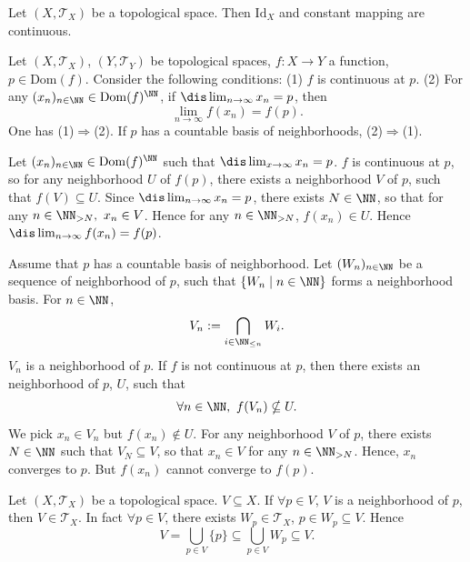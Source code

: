 \begin{exampleenv}
    Let $\left(X,\mathscr{T}_X\right)$ be a topological space. Then $\mathrm{Id}_X$ and constant mapping are continuous.
\end{exampleenv}
\begin{theoremenv}
Let $\left(X,\mathscr{T}_X\right)$, $\left(Y,\mathscr{T}_Y\right)$ be topological spaces, $f:X\longrightarrow Y$ a function, $p\in \mathrm{Dom}(f)$. Consider the following conditions:
\newline
(1) $f$ is continuous at $p$.
\newline
(2) For any $(x_n)_{n\in \NN}\in \mathrm{Dom}(f)^{\NN}$, if $\dis \lim_{n\rightarrow \infty}x_n=p$, then 
$$\lim_{n\rightarrow \infty}f(x_n)=f(p).$$
One has (1)$\Rightarrow$(2). If $p$ has a countable basis of neighborhoods, (2)$\Rightarrow$(1).
\end{theoremenv}
\begin{proofenv}
    Let $(x_n)_{n\in\NN}\in \mathrm{Dom}(f)^{\NN}$ such that $\dis \lim_{x\rightarrow \infty}x_n=p$. $f$ is continuous at $p$, so for any neighborhood $U$ of $f(p)$, there exists a neighborhood $V$ of $p$, such that $f(V)\subseteq U$. Since $\dis \lim_{n\rightarrow \infty}x_n=p$, there exists $N\in \NN$, so that for any $n\in \NN_{>N},\ x_n \in V$. Hence for any $n\in \NN_{>N}$, $f(x_n)\in U$. Hence $\dis \lim_{n\rightarrow \infty}f(x_n)=f(p)$.

    Assume that $p$ has a countable basis of neighborhood. Let $(W_n)_{n\in \NN}$ be a sequence of neighborhood of $p$, such that $\{W_n\mid n\in \NN\}$ forms a neighborhood basis. For $n\in \NN$, 
    $$V_n:=\bigcap_{i\in \NN_{\le n}}W_i.$$
    $V_n$ is a neighborhood of $p$. If $f$ is not continuous at $p$, then there exists an neighborhood of $p$, $U$, such that 
    $$\forall n\in \NN,\ f(V_n)\nsubseteq U.$$
    We pick $x_n\in V_n$ but $f(x_n)\notin U.$ For any neighborhood $V$ of $p$, there exists $N\in \NN$ such that $V_N\subseteq V$, so that $x_n\in V$ for any $n\in \NN_{>N}$. Hence, $x_n$ converges to $p$. But $f(x_n)$ cannot converge to $f(p)$.
\end{proofenv}
\begin{lemmaenv}
    Let $(X,\mathscr{T}_X)$ be a topological space. $V\subseteq X$. If $\forall p\in V$, $V$ is a neighborhood of $p$, then $V\in \mathscr{T}_X$. In fact $\forall p\in V$, there exists $W_p\in \mathscr{T}_X$, $p\in W_p\subseteq V$. Hence 
    $$V=\bigcup_{p\in V}\{p\}\subseteq \bigcup_{p\in V} W_p\subseteq V.$$
\end{lemmaenv}
